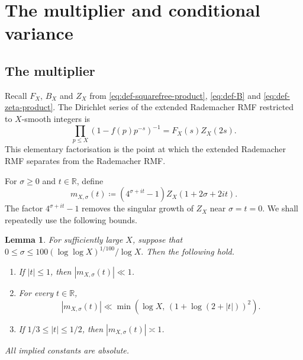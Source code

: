 \documentclass[a4paper,12pt,reqno]{amsart}
\numberwithin{equation}{section}
\newtheorem{lemma}[theorem]{Lemma}
\theoremstyle{remark}
\newcommand{\R}{\mathbb{R}}
\begin{document}
\section{The multiplier and conditional variance}\label{sec:variance}

\subsection{The  multiplier}

Recall $F_X$, $B_X$ and $Z_X$ from
\eqref{eq:def-squarefree-product}, \eqref{eq:def-B}
and \eqref{eq:def-zeta-product}.
The Dirichlet series of the extended Rademacher RMF restricted to $X$-smooth integers is 
\[
 \prod_{p\leq X}(1-f(p)p^{-s})^{-1}=F_X(s)Z_X(2s).
\]
This elementary factorisation is the point at which the extended
Rademacher RMF separates from the Rademacher RMF.

For $\sigma\geq 0$ and $t\in\R$, define
\begin{equation}\label{eq:def-multiplier}
 m_{X,\sigma}(t)
 \coloneqq
 (4^{\sigma+it}-1)Z_X(1+2\sigma+2it).
\end{equation}
The factor $4^{\sigma+it}-1$ removes the singular growth of $Z_X$ near
$\sigma=t=0$. We shall repeatedly use the following bounds.

\begin{lemma}\label{lem:multiplier}
For sufficiently large $X$, suppose that
\(
 0\leq \sigma\leq
 {100(\log\log X)^{1/100}}/{\log X}.
\)
Then the following hold.
\begin{enumerate}
\item If $|t|\leq1$, then $|m_{X,\sigma}(t)|\ll1$.
\item For every $t\in\R$,
\[
 |m_{X,\sigma}(t)|\ll
 \min\left(\log X,\,(1+\log(2+|t|))^2\right).
\]
\item If $1/3\leq |t|\leq1/2$, then
$|m_{X,\sigma}(t)|\asymp1$.
\end{enumerate}
All implied constants are absolute.
\end{lemma}
\end{document}
